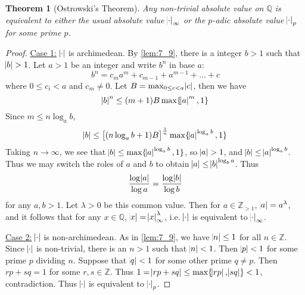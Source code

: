 \documentclass[11pt]{article}
\theoremstyle{definition}
\theoremstyle{plain}
\newtheorem{theorem}[definition]{Theorem}
\theoremstyle{remark}
\newcommand{\bZ}{\mathbb{Z}}
\newcommand{\bQ}{\mathbb{Q}}
\begin{document}
\begin{theorem}[Ostrowski's Theorem]\label{thm:7_10}
    Any non-trivial absolute value on $\bQ$ is equivalent to either the usual absolute value $\abs{\cdot}_\infty$ or the $p$-adic absolute value $\abs{\cdot}_p$ for some prime $p$.
\end{theorem}
\begin{proof}
    \underline{Case 1:} $\abs{\cdot}$ is archimedean.
    By \autoref{lem:7_9}, there is a integer $b > 1$ such that $\abs{b} > 1$. Let $a > 1$ be an integer and write $b^n$ in base $a$:
    \begin{equation*}
        b^n = c_m a^m + c_{m-1} + a^{m-1} + \ldots + c
    \end{equation*}
    where $0 \le c_i < a$ and $c_m \neq 0$. Let $B = \max_{0 \le c < a} \abs{c}$, then we have
    \begin{equation*}
        \abs{b}^n \le (m + 1) B \max \{\abs{a}^m, 1\}
    \end{equation*}
    Since $m \le n \log_a{b}$,
    \begin{equation*}
        \abs{b} \le \left[(n \log_a{b} + 1) B \right]^{\frac{1}{n}} \max \{\abs{a}^{\log_a{b}}, 1\}
    \end{equation*}
    Taking $n \to \infty$, we see that $\abs{b} \le \max \{\abs{a}^{\log_a{b}}, 1\}$, so $\abs{a} > 1$, and $\abs{b} \le \abs{a}^{\log_a{b}}$. Thus we may switch the roles of $a$ and $b$ to obtain $\abs{a} \le \abs{b}^{\log_b{a}}$. Thus
    \begin{equation*}
        \frac{\log{\abs{a}}}{\log{a}} = \frac{\log{\abs{b}}}{\log{b}}
    \end{equation*}
    for any $a, b > 1$. Let $\lambda > 0$ be this common value. Then for $a \in \bZ_{>1}$, $\abs{a} = a^\lambda$, and it follows that for any $x \in \bQ$, $\abs{x} = \abs{x}_\infty^\lambda$, i.e. $\abs{\cdot}$ is equivalent to $\abs{\cdot}_\infty$.

    \underline{Case 2:} $\abs{\cdot}$ is non-archimedean. As in \autoref{lem:7_9}, we have $\abs{n} \le 1$ for all $n \in \bZ$. Since $\abs{\cdot}$ is non-trivial, there is an $n > 1$ such that $\abs{n} < 1$. Then $\abs{p} < 1$ for some prime $p$ dividing $n$. Suppose that $\abs{q} < 1$ for some other prime $q \neq p$. Then $rp + sq = 1$ for some $r, s \in \bZ$. Thus $1 = \abs{rp + sq} \le \max\{\abs{rp}, \abs{sq}\} < 1$, contradiction. Thus $\abs{\cdot}$ is equivalent to $\abs{\cdot}_p$.
\end{proof}
\end{document}
